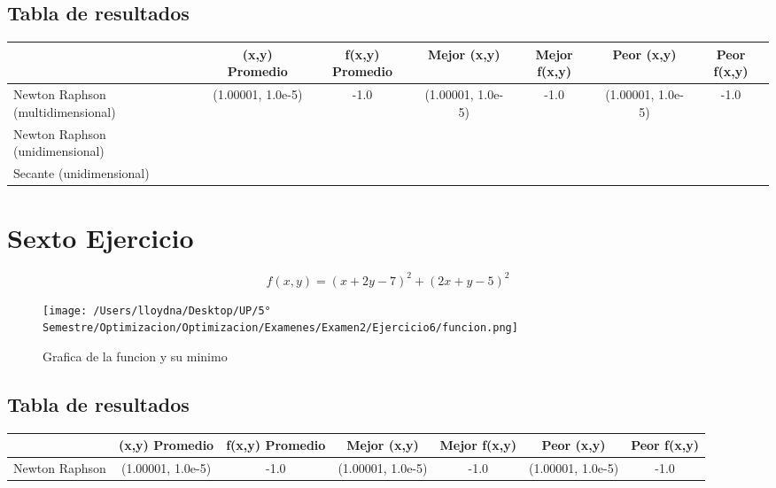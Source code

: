 \documentclass{report}
\begin{document}
            \subsection{Tabla de resultados}
                \begin{tabular}{l|c|c|c|c|c|c}
                    & (x,y) Promedio & f(x,y) Promedio & Mejor (x,y) & Mejor f(x,y) & Peor (x,y) & Peor f(x,y)\\
                    \hline
                    Newton Raphson (multidimensional) & (1.00001, 1.0e-5) & -1.0 & (1.00001, 1.0e-5) & -1.0 & (1.00001, 1.0e-5) & -1.0\\
                    \hline
                    Newton Raphson (unidimensional) & & & & & & \\
                    \hline
                    Secante (unidimensional) & & & & & & \\
                    \hline
                \end{tabular}
        \pagebreak

        \section{Sexto Ejercicio}
            \begin{equation*}
                f(x,y)=(x+2y-7)^2+(2x+y-5)^2
            \end{equation*}

            \begin{figure}[H]
                \texttt{[image: /Users/lloydna/Desktop/UP/5° Semestre/Optimizacion/Optimizacion/Examenes/Examen2/Ejercicio6/funcion.png]}
                \caption{Grafica de la funcion y su minimo}
                \label{fig:fun16}
            \end{figure}

            \subsection{Tabla de resultados}
                \begin{tabular}{l|c|c|c|c|c|c}
                    & (x,y) Promedio & f(x,y) Promedio & Mejor (x,y) & Mejor f(x,y) & Peor (x,y) & Peor f(x,y)\\
                    \hline
                    Newton Raphson & (1.00001, 1.0e-5) & -1.0 & (1.00001, 1.0e-5) & -1.0 & (1.00001, 1.0e-5) & -1.0\\
                    \hline
                \end{tabular}
        \pagebreak
\end{document}
